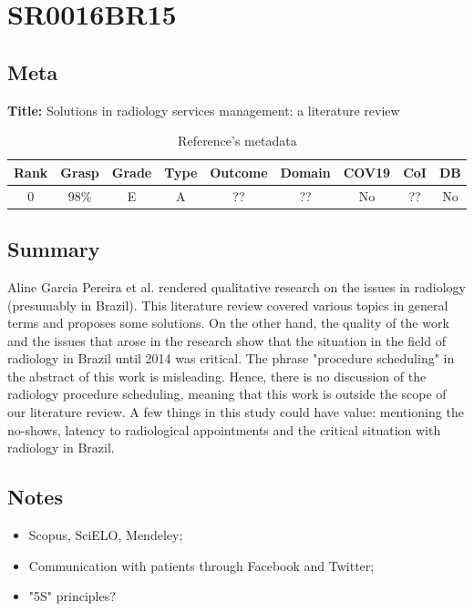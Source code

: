 \section{ SR0016BR15 }


\subsection{Meta}

    \textbf{Title:}
    Solutions in radiology services management: a literature review

    \begin{table}[H]
        \centering
        \begin{tabular}{|c|c|c|c|c|c|c|c|c|}
            \hline
                \textbf{Rank} & \textbf{Grasp} & \textbf{Grade} & \textbf{Type} & \textbf{Outcome} & \textbf{Domain} & \textbf{COV19} & \textbf{CoI} & \textbf{DB} \\
            \hline
                0 & 98\% & E & A & ?? & ?? & No & ?? & No \\
            \hline
        \end{tabular}
        \caption{Reference's metadata}
        \label{tab:SR0016BR15}
    \end{table}

\subsection{Summary}
    Aline Garcia Pereira et al. \cite{x073} rendered qualitative research on the issues in radiology (presumably in Brazil). This literature review covered various topics in general terms and proposes some solutions. On the other hand, the quality of the work and the issues that arose in the research show that the situation in the field of radiology in Brazil until 2014 was critical. The phrase "procedure scheduling" in the abstract of this work is misleading. Hence, there is no discussion of the radiology procedure scheduling, meaning that this work is outside the scope of our literature review. A few things in this study could have value: mentioning the no-shows, latency to radiological appointments and the critical situation with radiology in Brazil. 

\subsection{Notes}
    \begin{itemize}
        \item Scopus, SciELO, Mendeley;
        \item Communication with patients through Facebook and Twitter;
        \item "5S" principles?
    \end{itemize}


